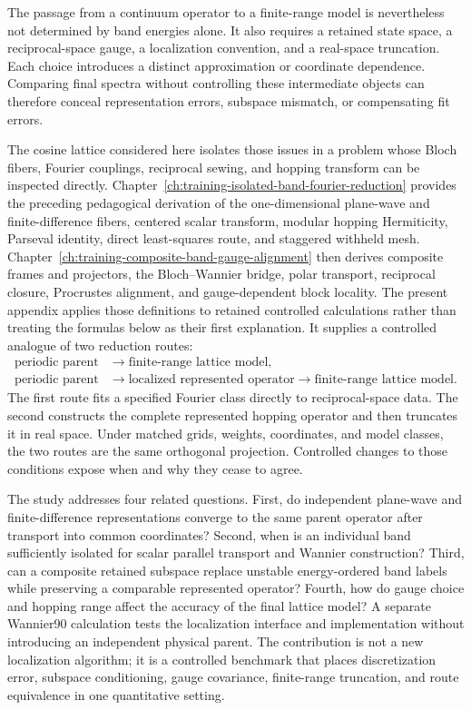 The passage from a continuum operator to a finite-range model is nevertheless
not determined by band energies alone. It also requires a retained state space,
a reciprocal-space gauge, a localization convention, and a real-space
truncation. Each choice introduces a distinct approximation or coordinate
dependence. Comparing final spectra without controlling these intermediate
objects can therefore conceal representation errors, subspace mismatch, or
compensating fit errors.

The cosine lattice considered here isolates those issues in a problem whose
Bloch fibers, Fourier couplings, reciprocal sewing, and hopping transform can be
inspected directly. Chapter~\ref{ch:training-isolated-band-fourier-reduction}
provides the preceding pedagogical derivation of the one-dimensional
plane-wave and finite-difference fibers, centered scalar transform, modular
hopping Hermiticity, Parseval identity, direct least-squares route, and
staggered withheld mesh. Chapter~\ref{ch:training-composite-band-gauge-alignment}
then derives composite frames and projectors, the Bloch--Wannier bridge, polar
transport, reciprocal closure, Procrustes alignment, and gauge-dependent block
locality. The present appendix applies those definitions to retained controlled
calculations rather than treating the formulas below as their first
explanation. It supplies a controlled analogue of two reduction routes:
\begin{align}
    \text{periodic parent}
    &\longrightarrow
    \text{finite-range lattice model},
    \label{eq:periodic-1d-direct-route}
    \\
    \text{periodic parent}
    &\longrightarrow
    \text{localized represented operator}
    \longrightarrow
    \text{finite-range lattice model}.
    \label{eq:periodic-1d-mediated-route}
\end{align}
The first route fits a specified Fourier class directly to reciprocal-space
data. The second constructs the complete represented hopping operator and then
truncates it in real space. Under matched grids, weights, coordinates, and model
classes, the two routes are the same orthogonal projection. Controlled changes
to those conditions expose when and why they cease to agree.

The study addresses four related questions. First, do independent
plane-wave and finite-difference representations converge to the same parent
operator after transport into common coordinates? Second, when is an individual
band sufficiently isolated for scalar parallel transport and Wannier
construction? Third, can a composite retained subspace replace unstable
energy-ordered band labels while preserving a comparable represented operator?
Fourth, how do gauge choice and hopping range affect the accuracy of the final
lattice model? A separate Wannier90 calculation tests the localization
interface and implementation without introducing an independent physical
parent. The contribution is not a new localization algorithm; it is a
controlled benchmark that places discretization error, subspace conditioning,
gauge covariance, finite-range truncation, and route equivalence in one
quantitative setting.

